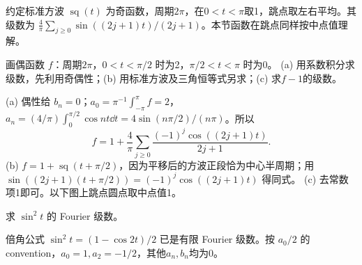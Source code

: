 约定标准方波 $\operatorname{sq}(t)$ 为奇函数，周期$2\pi$，在$0<t<\pi$取1，跳点取左右平均。其级数为 $\frac4\pi\sum_{j\ge0}\sin((2j+1)t)/(2j+1)$。本节函数在跳点同样按中点值理解。
\begin{exercise}\label{cw:rec14-1}
画偶函数 $f$：周期$2\pi$，$0<t<\pi/2$ 时为2，$\pi/2<t<\pi$ 时为0。
(a) 用系数积分求级数，先利用奇偶性；(b) 用标准方波及三角恒等式另求；(c) 求$f-1$的级数。
\end{exercise}
\begin{solution}
(a) 偶性给 $b_n=0$；$a_0=\pi^{-1}\int_{-\pi}^\pi f=2$，$a_n=(4/\pi)\int_0^{\pi/2}\cos nt\dd t=4\sin(n\pi/2)/(n\pi)$。所以
\[f=1+\frac4\pi\sum_{j\ge0}\frac{(-1)^j\cos((2j+1)t)}{2j+1}.\]
(b) $f=1+\operatorname{sq}(t+\pi/2)$，因为平移后的方波正段恰为中心半周期；用 $\sin((2j+1)(t+\pi/2))=(-1)^j\cos((2j+1)t)$ 得同式。
(c) 去常数项1即可。以下图上跳点圆点取中点值1。\begin{center}\end{center}
\par{}
\end{solution}

\begin{exercise}\label{cw:rec14-2}
求 $\sin^2t$ 的 Fourier 级数。
\end{exercise}
\begin{solution}
倍角公式 $\sin^2t=(1-\cos2t)/2$ 已是有限 Fourier 级数。按 $a_0/2$ 的 convention，$a_0=1,a_2=-1/2$，其他$a_n,b_n$均为0。
\par{}
\end{solution}

